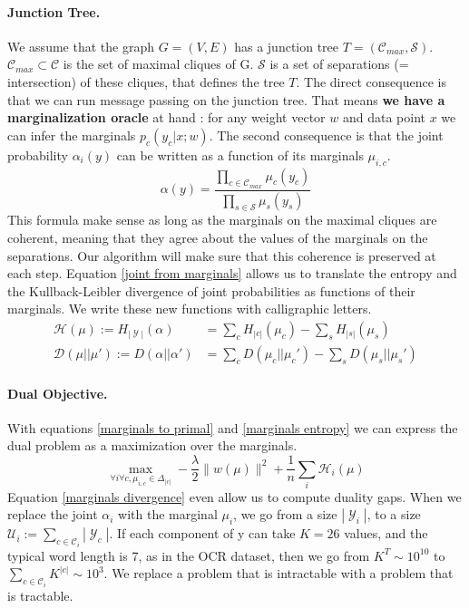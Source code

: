 \documentclass{article}
\DeclareMathOperator{\1}{\mathbb{1}}
\DeclareMathOperator{\Y}{\mathcal{Y}}
\begin{document}
\paragraph{Junction Tree.}
We assume that the graph $G=(V,E)$ has a junction tree $T=(\mathcal C_{max},\mathcal{S})$.
$\mathcal C_{max} \subset \mathcal C $ is the set of maximal cliques of G.
$\mathcal S$ is a set of separations (= intersection) of these cliques, that defines the tree $T$.
The direct consequence is that we can run message passing on the junction tree.
That means \textbf{we have a marginalization oracle} at hand : for any weight vector $w$ and data point $x$ we can infer the marginals $p_c(y_c |x ; w)$.
The second consequence is that the joint probability $\alpha_i(y)$ can be written as a function of its marginals $\mu_{i, c}$.
\begin{equation}
	\label{joint from marginals}
	\alpha(y) = \frac{\prod_{c\in\mathcal{C}_{max}} \mu_c(y_c)}{\prod_{s\in\mathcal{S}} \mu_s(y_s)}
\end{equation}
This formula make sense as long as the marginals on the maximal cliques are coherent, meaning that they agree about the values of the marginals on the separations.
Our algorithm will make sure that this coherence is preserved at each step.
Equation \ref{joint from marginals} allows us to translate the entropy and the Kullback-Leibler divergence of joint probabilities as functions of their marginals. We write these new functions with calligraphic letters.
\begin{align}
	\label{marginals entropy}
	\mathcal H (\mu) := H_{|\Y|} (\alpha) & = \sum_c H_{|c|}(\mu_c) - \sum_s H_{|s|}(\mu_s) \\
	\label{marginals divergence}
	\mathcal D (\mu||\mu') := D(\alpha||\alpha') & = \sum_c D(\mu_c||\mu_c') - \sum_s D(\mu_s||\mu_s')
\end{align}


\paragraph{Dual Objective.}
With equations \ref{marginals to primal} and \ref{marginals entropy} we can express the dual problem as a maximization over the marginals.
\begin{equation}
	\max_{\forall i \forall c, \mu_{i, c} \in \Delta_{|c|} } - \frac{\lambda}{2} \|w(\mu)\|^2 + \frac{1}{n} \sum_i \mathcal H _ i(\mu)
\end{equation}
Equation \ref{marginals divergence} even allow us to compute duality gaps.
When we replace the joint $\alpha_i$ with the marginal $\mu_i$, we go from a size $|\Y_i|$, to a size $\mathcal U_i := \sum_{c \in \mathcal C_i} |\Y_c|$.
If each component of y can take $K=26$ values, and the typical word length is 7, as in the OCR dataset, then we go from $K^T \sim 10^{10}$ to $\sum_{c \in \mathcal C_i} K^{|c|} \sim 10^3$.
We replace a problem that is intractable with a problem that is tractable.
\end{document}
